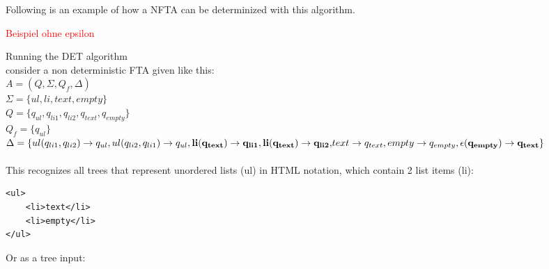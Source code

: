\documentclass{llncs}
\begin{document}
\pagebreak

\newcommand{\automatonDefinition} {
	\(A = (Q, \Sigma, Q_f, \Delta)\)
}

Following is an example of how a NFTA can be determinized with this algorithm.

\textcolor{red}{Beispiel ohne epsilon}

	\begin{example}{Running the DET algorithm}
		\\
		consider a non deterministic FTA given like this:\\
		\automatonDefinition\\
		\(\Sigma = \{ul, li, text, empty\}\)\\
		\(Q = \{q_{ul}, q_{li1}, q_{li2}, q_{text}, q_{empty}\}\)\\
		\(Q_f = \{q_{ul}\}\)\\
		\(\Delta = \{
		ul(q_{li1},q_{li2}) \rightarrow q_{ul}, ul(q_{li2},q_{li1}) \rightarrow q_{ul}, \\
		\mathbf{li(q_{text}) \rightarrow q_{li1}, li(q_{text}) \rightarrow q_{li2},}\\
		text \rightarrow q_{text}, empty \rightarrow q_{empty}, \\
		\mathbf{\epsilon(q_{empty}) \rightarrow q_{text}}
		\}\)
		\\\\
		This recognizes all trees that represent unordered lists (ul) in HTML notation, which contain 2 list items (li):
			\lstset{
				basicstyle=\footnotesize, frame=tb,
				xleftmargin=.4\textwidth, xrightmargin=.5\textwidth
			}
			\begin{lstlisting}[frame=none]
<ul>
    <li>text</li>
    <li>empty</li>
</ul>
			\end{lstlisting}
			Or as a tree input:
			\begin{center}
\end{center}
\end{example}
\end{document}
